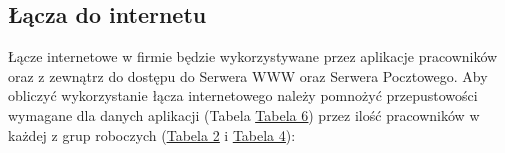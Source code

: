 \documentclass[a4paper,12pt]{extarticle}  %
\begin{document}
\subsection{Łącza do internetu}
Łącze internetowe w firmie będzie wykorzystywane przez aplikacje pracowników oraz z
zewnątrz do dostępu do Serwera WWW oraz Serwera Pocztowego.
Aby obliczyć wykorzystanie łącza internetowego należy pomnożyć przepustowości
wymagane dla danych aplikacji (Tabela \underline{\href{tab:apps}{Tabela 6}}) przez ilość pracowników w każdej
z grup roboczych (\underline{\href{tab:groups_sum}{Tabela 2}} i \underline{\href{tab:devices_sum}{Tabela 4}}):
\begin{table}[H]
	\centering
	\caption{Pobór danych przez aplikacje}
	\label{tab:app_usage_download}%

\end{table}%
\end{document}
